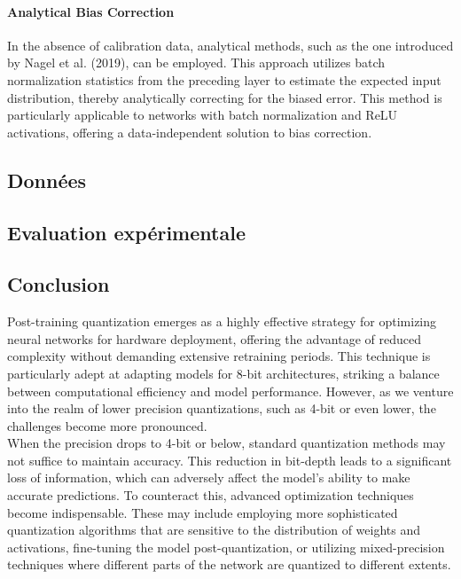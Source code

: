 \documentclass[10pt]{article}
\begin{document}
\paragraph{Analytical Bias Correction}
In the absence of calibration data, analytical methods, such as the one introduced by Nagel et al. (2019), can be employed. This approach utilizes batch normalization statistics from the preceding layer to estimate the expected input distribution, thereby analytically correcting for the biased error. This method is particularly applicable to networks with batch normalization and ReLU activations, offering a data-independent solution to bias correction.



\subsection{Données}
\subsection{Evaluation expérimentale}

\subsection{Conclusion}

Post-training quantization emerges as a highly effective strategy for optimizing neural networks for hardware deployment, offering the advantage of reduced complexity without demanding extensive retraining periods. This technique is particularly adept at adapting models for 8-bit architectures, striking a balance between computational efficiency and model performance. However, as we venture into the realm of lower precision quantizations, such as 4-bit or even lower, the challenges become more pronounced.\\

When the precision drops to 4-bit or below, standard quantization methods may not suffice to maintain accuracy. This reduction in bit-depth leads to a significant loss of information, which can adversely affect the model's ability to make accurate predictions. To counteract this, advanced optimization techniques become indispensable. These may include employing more sophisticated quantization algorithms that are sensitive to the distribution of weights and activations, fine-tuning the model post-quantization, or utilizing mixed-precision techniques where different parts of the network are quantized to different extents.\\
\end{document}
